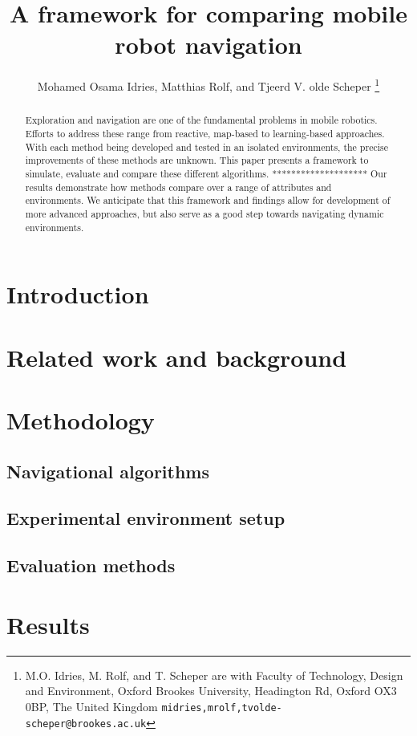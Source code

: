 \documentclass[letterpaper, 10 pt, conference]{ieeeconf}  %
\title{\LARGE \bf
A framework for comparing mobile robot navigation
}
\author{Mohamed Osama Idries, Matthias Rolf, and Tjeerd V. olde Scheper%
\thanks{M.O. Idries, M. Rolf, and T. Scheper are with Faculty of Technology, Design and Environment,
        Oxford Brookes University, Headington Rd, Oxford OX3 0BP, The United Kingdom
        {\tt\small {midries,mrolf,tvolde-scheper}@brookes.ac.uk}}%
}
\begin{document}
\maketitle
\thispagestyle{empty}
\pagestyle{empty}


\begin{abstract}
	Exploration and navigation are one of the fundamental problems in mobile robotics. Efforts to address these range from reactive, map-based to learning-based approaches. With each method being developed and tested in an isolated environments, the precise improvements of these methods are unknown. This paper presents a framework to simulate, evaluate and compare these different algorithms.
	********************
	Our results demonstrate how methods compare over a range of attributes and environments. We anticipate that this framework and findings allow for development of more advanced approaches, but also serve as a good step towards navigating dynamic environments. 
	
\end{abstract}


\section{Introduction}

\section{Related work and background}
\section{Methodology}
\subsection{Navigational algorithms}
\subsection{Experimental environment setup}
\subsection{Evaluation methods}
\section{Results}
\end{document}
